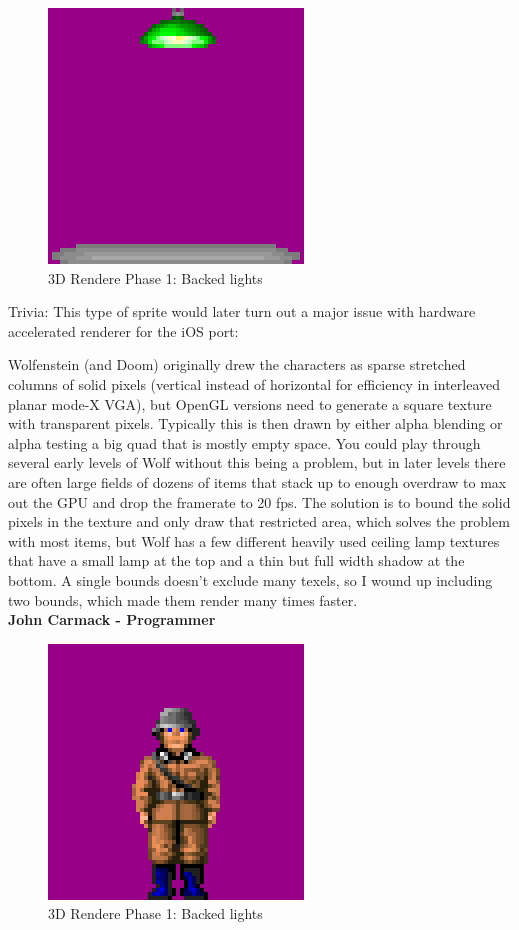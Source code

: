 \documentclass[book.tex]{subfiles}
\begin{document}
  \begin{figure}[H]
\centering
 \includegraphics[scale=1.3]{imgs/light_sprite.png}
 \caption{3D Rendere Phase 1: Backed lights} \label{fig:backee_lights}
 \end{figure}
Trivia: This type of sprite would later turn out a major issue with hardware accelerated renderer for the iOS port:

\begin{fancyquotes}
Wolfenstein (and Doom) originally drew the characters as sparse stretched columns of solid pixels (vertical instead of horizontal for efficiency in interleaved planar mode-X VGA), but OpenGL versions need to generate a square texture with transparent pixels.  Typically this is then drawn by either alpha blending or alpha testing a big quad that is mostly empty space.  You could play through several early levels of Wolf without this being a problem, but in later levels there are often large fields of dozens of items that stack up to enough overdraw to max out the GPU and drop the framerate to 20 fps.  The solution is to bound the solid pixels in the texture and only draw that restricted area, which solves the problem with most items, but Wolf has a few different heavily used ceiling lamp textures that have a small lamp at the top and a thin but full width shadow at the bottom.  A single bounds doesn't exclude many texels, so I wound up including two bounds, which made them render many times faster. 
\bigskip \\
\textbf{John Carmack - Programmer}
 \end{fancyquotes}

  \begin{figure}[H]
\centering
 \includegraphics[scale=1.3]{imgs/guard_sprite.png}
 \caption{3D Rendere Phase 1: Backed lights} \label{fig:backee_lights}
 \end{figure}
\end{document}
